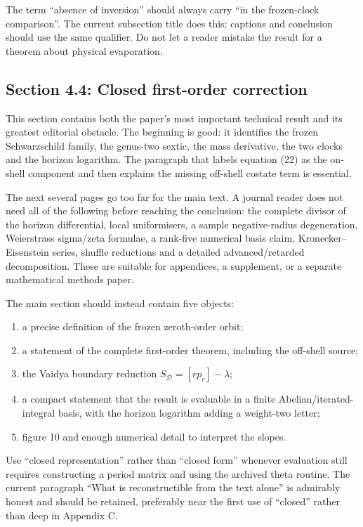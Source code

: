 \documentclass[11pt,a4paper]{article}
\begin{document}
The term ``absence of inversion'' should always carry ``in the frozen-clock comparison''.  The
current subsection title does this; captions and conclusion should use the same qualifier.  Do not
let a reader mistake the result for a theorem about physical evaporation.

\subsection{Section 4.4: Closed first-order correction}

This section contains both the paper's most important technical result and its greatest editorial
obstacle.  The beginning is good: it identifies the frozen Schwarzschild family, the genus-two
sextic, the mass derivative, the two clocks and the horizon logarithm.  The paragraph that labels
equation (22) as the on-shell component and then explains the missing off-shell costate term is
essential.

The next several pages go too far for the main text.  A journal reader does not need all of the
following before reaching the conclusion: the complete divisor of the horizon differential,
local uniformisers, a sample negative-radius degeneration, Weierstrass sigma/zeta formulae, a
rank-five numerical basis claim, Kronecker--Eisenstein series, shuffle reductions and a detailed
advanced/retarded decomposition.  These are suitable for appendices, a supplement, or a separate
mathematical methods paper.

The main section should instead contain five objects:

\begin{enumerate}
  \item a precise definition of the frozen zeroth-order orbit;
  \item a statement of the complete first-order theorem, including the off-shell source;
  \item the Vaidya boundary reduction $S_{\mathcal D}=[r p_r]-\lambda$;
  \item a compact statement that the result is evaluable in a finite Abelian/iterated-integral
  basis, with the horizon logarithm adding a weight-two letter;
  \item figure 10 and enough numerical detail to interpret the slopes.
\end{enumerate}

Use ``closed representation'' rather than ``closed form'' whenever evaluation still requires
constructing a period matrix and using the archived theta routine.  The current paragraph ``What
is reconstructible from the text alone'' is admirably honest and should be retained, preferably
near the first use of ``closed'' rather than deep in Appendix C.
\end{document}
